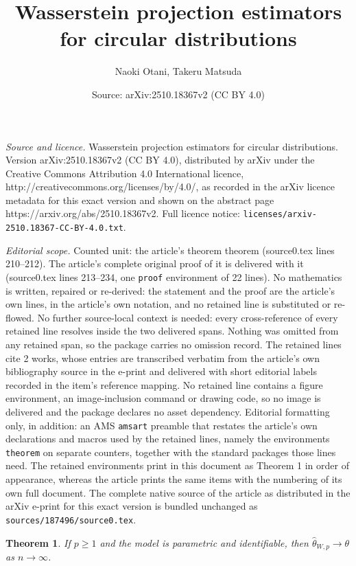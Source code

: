 \documentclass[10pt,a4paper]{amsart}
\title{Wasserstein projection estimators for circular distributions}
\author{Naoki Otani, Takeru Matsuda}
\date{Source: arXiv:2510.18367v2 (CC BY 4.0)}
\newtheorem{theorem}{Theorem}
\begin{document}
\maketitle

\noindent\emph{Source and licence.} Wasserstein projection estimators for circular distributions. Version arXiv:2510.18367v2 (CC BY 4.0), distributed by arXiv under the Creative Commons Attribution 4.0 International licence, http://creativecommons.org/licenses/by/4.0/, as recorded in the arXiv licence metadata for this exact version and shown on the abstract page https://arxiv.org/abs/2510.18367v2. Full licence notice: \texttt{licenses/arxiv-2510.18367-CC-BY-4.0.txt}.\par\smallskip

\noindent\textit{Editorial scope.} Counted unit: the article's theorem theorem (source0.tex lines 210--212). The article's complete original proof of it is delivered with it (source0.tex lines 213--234, one \texttt{proof} environment of 22 lines). No mathematics is written, repaired or re-derived: the statement and the proof are the article's own lines, in the article's own notation, and no retained line is substituted or re-flowed.  No further source-local context is needed: every cross-reference of every retained line resolves inside the two delivered spans.  Nothing was omitted from any retained span, so the package carries no omission record.  The retained lines cite 2 works, whose entries are transcribed verbatim from the article's own bibliography source in the e-print and delivered with short editorial labels recorded in the item's reference mapping.  No retained line contains a figure environment, an image-inclusion command or drawing code, so no image is delivered and the package declares no asset dependency.  Editorial formatting only, in addition: an AMS \texttt{amsart} preamble that restates the article's own declarations and macros used by the retained lines, namely the environments \texttt{theorem} on separate counters, together with the standard packages those lines need.  The retained environments print in this document as Theorem 1 in order of appearance, whereas the article prints the same items with the numbering of its own full document.  The complete native source of the article as distributed in the arXiv e-print for this exact version is bundled unchanged as \texttt{sources/187496/source0.tex}.
\begin{theorem}
	If $p \geq 1$ and the model is parametric and identifiable, then $\hat{\theta}_{W,p} \to \theta$ as $n \to \infty$.
\end{theorem}
\end{document}
